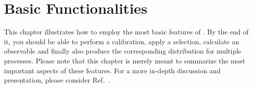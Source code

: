 \chapter{Basic Functionalities}\label{chap:basics}

This chapter illustrates how to employ the most basic features of \columnflow. By the end of it, you should be able to perform a calibration, apply a selection, calculate an observable and finally also produce the corresponding distribution for multiple processes. Please note that this chapter is merely meant to summarize the most important aspects of these features. For a more in-depth discussion and presentation, please consider Ref.~\cite{cf_repo}.






